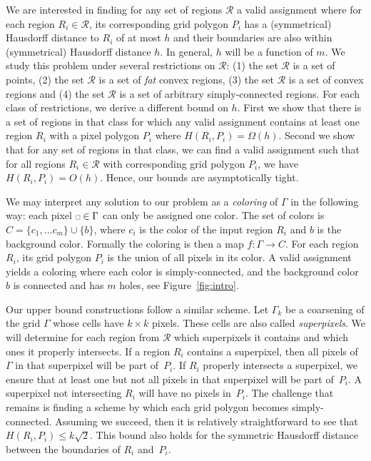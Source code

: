 \documentclass[a4paper, 11pt]{article}
\newcommand{\pix}{\scalebox{0.6}{$\square$}}
\begin{document}
We are interested in finding for any set of regions $\mathcal{R}$ a valid assignment where for each region $R_i \in \mathcal{R}$, its corresponding grid polygon $P_i$ has a (symmetrical) Hausdorff distance to $R_i$ of at most $h$ and their boundaries are also within (symmetrical) Hausdorff distance $h$.
In general, $h$ will be a function of $m$. We study this problem under several restrictions on $\mathcal{R}$: (1) the set $\mathcal{R}$ is a set of points, (2) the set $\mathcal{R}$ is a set of \emph{fat} convex regions, (3) the set $\mathcal{R}$ is a set of convex regions and (4) the set $\mathcal{R}$ is a set of arbitrary simply-connected regions.
For each class of restrictions, we derive a different bound on $h$. First we show that there is a set of regions in that class for which any valid assignment contains at least one region $R_i$ with a pixel polygon $P_i$ where $H(R_i, P_i) = \Omega(h)$. Second we show that for any set of regions in that class, we can find a valid assignment such that for all regions $R_i \in \mathcal{R}$ with corresponding grid polygon $P_i$, we have $H(R_i, P_i) = O(h)$. Hence, our bounds are asymptotically tight.

We may interpret any solution to our problem as a {\em coloring} of $\Gamma$ in the following way:
each pixel $\pix\in\Gamma$ can only be assigned one color. The set of colors is $C = \{c_1,\dots c_m\}\cup\{b\}$, where $c_i$ is the color of the input region $R_i$ and $b$ is the background color.
Formally the coloring is then a map $f:\Gamma\to C$. For each region $R_i$, its grid polygon $P_i$ is the union of all pixels in its color. A valid assignment yields a coloring where each color is simply-connected, and the background color $b$ is connected and has $m$ holes, see Figure~\ref{fig:intro}.

Our upper bound constructions follow a similar scheme. Let $\Gamma_k$ be a coarsening of the grid $\Gamma$ whose cells have $k\times k$ pixels. These cells are also called \emph{superpixels}. We will determine for each region from $\mathcal{R}$ which superpixels it contains and which ones it properly intersects.
If a region $R_i$ contains a superpixel, then all pixels of $\Gamma$ in that superpixel will be part of~$P_i$. If $R_i$ properly intersects a superpixel, we ensure that at least one but not all pixels in that superpixel will be part of~$P_i$. A superpixel not intersecting $R_i$ will have no pixels in~$P_i$.
The challenge that remains is finding a scheme by which each grid polygon becomes simply-connected. Assuming we succeed, then it is relatively straightforward to see that $H(R_i,P_i) \le k\sqrt{2}$. This bound also holds for the symmetric Hausdorff distance between the boundaries of $R_i$ and~$P_i$.
\end{document}
